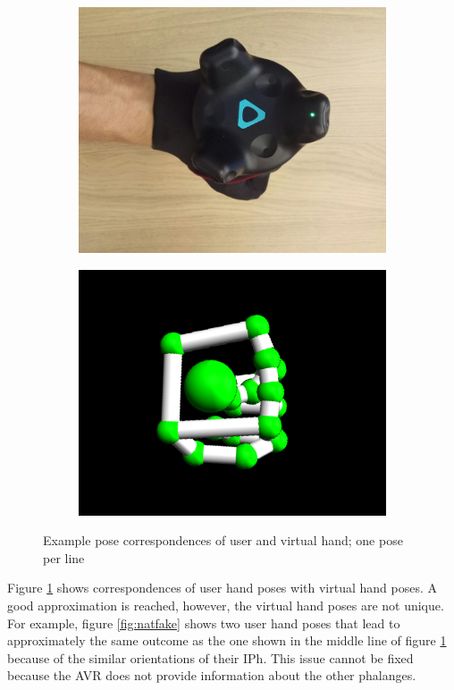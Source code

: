 \documentclass[hyperref, bachelorofscience]{cgvpub}
\begin{document}
\begin{figure}[b!]
\begin{subfigure}{.235\linewidth}
		\includegraphics[width=\linewidth]{../pics/hand_dorsal_ball}
	\end{subfigure}
	\hspace{.01cm}
	\begin{subfigure}{.235\linewidth}
		\includegraphics[width=\linewidth]{../pics/model_dorsal_ball}
	\end{subfigure}
	\caption{Example pose correspondences of user and virtual hand; one pose per line}
	\label{fig:hand_correspondences}
\end{figure}
Figure \ref{fig:hand_correspondences} shows correspondences of user hand poses with virtual hand poses. A good approximation is reached, however, the virtual hand poses are not unique. For example, figure \ref{fig:natfake} shows two user hand poses that lead to approximately the same outcome as the one shown in the middle line of figure \ref{fig:hand_correspondences} because of the similar orientations of their \gls{IPh}. This issue cannot be fixed because the \Gls{AVR} does not provide information about the other phalanges.
\end{document}
